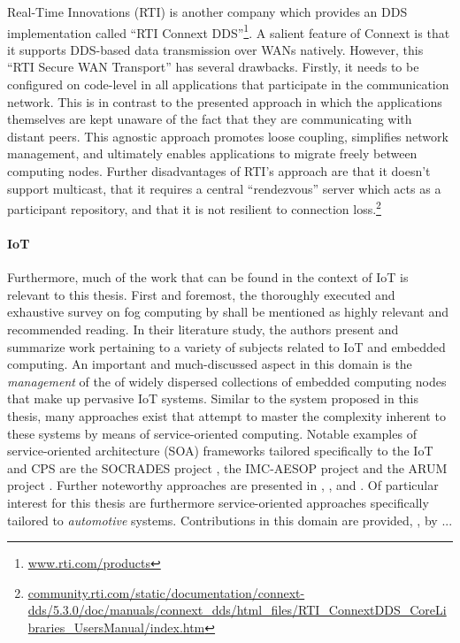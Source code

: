 Real-Time Innovations (RTI) is another company which provides an DDS implementation called ``RTI Connext DDS''\footnote{\url{www.rti.com/products}}. A salient feature of Connext is that it supports DDS-based data transmission over WANs natively. However, this ``RTI Secure WAN Transport'' has several drawbacks. Firstly, it needs to be configured on code-level in all applications that participate in the communication network. This is in contrast to the presented approach in which the applications themselves are kept unaware of the fact that they are communicating with distant peers. This agnostic approach promotes loose coupling, simplifies network management, and ultimately enables applications to migrate freely between computing nodes. Further disadvantages of RTI's approach are that it doesn't support multicast, that it requires a central ``rendezvous'' server which acts as a participant repository, and that it is not resilient to connection loss.\footnote{\url{community.rti.com/static/documentation/connext-dds/5.3.0/doc/manuals/connext_dds/html_files/RTI_ConnextDDS_CoreLibraries_UsersManual/index.htm}}


\paragraph{IoT}
Furthermore, much of the work that can be found in the context of IoT is relevant to this thesis. First and foremost, the thoroughly executed and exhaustive survey \cite{nath2018survey} on fog computing by \citeauthor*{nath2018survey} shall be mentioned as highly relevant and recommended reading. In their literature study, the authors present and summarize work pertaining to a variety of subjects related to IoT and embedded computing.
An important and much-discussed aspect in this domain is the \emph{management} of the of widely dispersed collections of embedded computing nodes that make up pervasive IoT systems. Similar to the system proposed in this thesis, many approaches exist that attempt to master the complexity inherent to these systems by means of service-oriented computing. Notable examples of service-oriented architecture (SOA) frameworks tailored specifically to the IoT and CPS are the SOCRADES project \cite{cannata2008socrades}, the IMC-AESOP project \cite{karnouskos2012soa} and the ARUM project \cite{marin2013conceptual}. Further noteworthy approaches are presented in \cite{butzin2016microservices}, \cite{kart2007distributed}, and \cite{teixeira2011service}. Of particular interest for this thesis are furthermore service-oriented approaches specifically tailored to \emph{automotive} systems. Contributions in this domain are provided, \eg , by \citeauthor*{kugele2017service} \cite{kugele2017service}...

